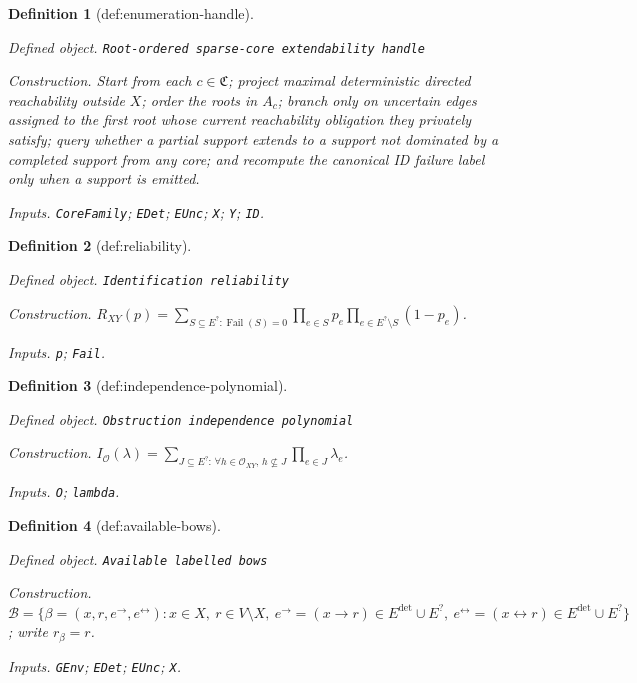 \documentclass{article}
\newtheorem{definition}{Definition}
\begin{document}
\begin{definition}[def:enumeration-handle]\label{def:enumeration-handle}
\par\smallskip\noindent\emph{Defined object.} \texttt{Root-\allowbreak{}ordered sparse-\allowbreak{}core extendability handle}
\par\smallskip\noindent\emph{Construction.} Start from each \(c\in\mathfrak C\); project maximal deterministic directed reachability outside \(X\); order the roots in \(A_c\); branch only on uncertain edges assigned to the first root whose current reachability obligation they privately satisfy; query whether a partial support extends to a support not dominated by a completed support from any core; and recompute the canonical ID failure label only when a support is emitted.
\par\smallskip\noindent\emph{Inputs.} \texttt{CoreFamily}; \texttt{EDet}; \texttt{EUnc}; \texttt{X}; \texttt{Y}; \texttt{ID}.
\end{definition}

\begin{definition}[def:reliability]\label{def:reliability}
\par\smallskip\noindent\emph{Defined object.} \texttt{Identification reliability}
\par\smallskip\noindent\emph{Construction.} \(R_{XY}(p)=\sum_{S\subseteq E^{?}:\operatorname{Fail}(S)=0}\prod_{e\in S}p_e\prod_{e\in E^{?}\setminus S}(1-p_e)\).
\par\smallskip\noindent\emph{Inputs.} \texttt{p}; \texttt{Fail}.
\end{definition}

\begin{definition}[def:independence-polynomial]\label{def:independence-polynomial}
\par\smallskip\noindent\emph{Defined object.} \texttt{Obstruction independence polynomial}
\par\smallskip\noindent\emph{Construction.} \(I_{\mathcal O}(\lambda)=\sum_{J\subseteq E^{?}:\,\forall h\in\mathcal O_{XY},\,h\nsubseteq J}\prod_{e\in J}\lambda_e\).
\par\smallskip\noindent\emph{Inputs.} \texttt{O}; \texttt{lambda}.
\end{definition}

\begin{definition}[def:available-bows]\label{def:available-bows}
\par\smallskip\noindent\emph{Defined object.} \texttt{Available labelled bows}
\par\smallskip\noindent\emph{Construction.} \(\mathcal B=\{\beta=(x,r,e^{\to},e^{\leftrightarrow}):x\in X,\ r\in V\setminus X,\ e^{\to}=(x\to r)\in E^{\mathrm{det}}\cup E^{?},\ e^{\leftrightarrow}=(x\leftrightarrow r)\in E^{\mathrm{det}}\cup E^{?}\}\); write \(r_\beta=r\).
\par\smallskip\noindent\emph{Inputs.} \texttt{GEnv}; \texttt{EDet}; \texttt{EUnc}; \texttt{X}.
\end{definition}
\end{document}

